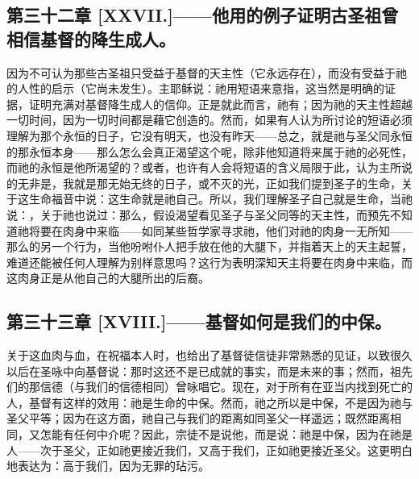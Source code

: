 
\subsection{第三十二章 [XXVII.]——他用的例子证明古圣祖曾相信基督的降生成人。}

因为不可认为那些古圣祖只受益于基督的天主性（它永远存在），而没有受益于祂的人性的启示（它尚未发生）。主耶稣说：祂用短语来意指，这当然是明确的证据，证明充满对基督降生成人的信仰。正是就此而言，祂有；因为祂的天主性超越一切时间，因为一切时间都是藉它创造的。然而，如果有人认为所讨论的短语必须理解为那个永恒的日子，它没有明天，也没有昨天——总之，就是祂与圣父同永恒的那永恒本身——那么怎么会真正渴望这个呢，除非他知道将来属于祂的必死性，而祂的永恒是他所渴望的？或者，也许有人会将短语的含义局限于此，认为主所说的无非是，我就是那无始无终的日子，或不灭的光，正如我们提到圣子的生命，关于这生命福音中说：这生命就是祂自己。所以，我们理解圣子自己就是生命，当祂说：，关于祂也说过：那么，假设渴望看见圣子与圣父同等的天主性，而预先不知道祂将要在肉身中来临——如同某些哲学家寻求祂，他们对祂的肉身一无所知——那么的另一个行为，当他吩咐仆人把手放在他的大腿下，并指着天上的天主起誓，难道还能被任何人理解为别样意思吗？这行为表明深知天主将要在肉身中来临，而这肉身正是从他自己的大腿所出的后裔。\par


\subsection{第三十三章 [XVIII.]——基督如何是我们的中保。}

关于这血肉与血，在祝福本人时，也给出了基督徒信徒非常熟悉的见证，以致很久以后在圣咏中向基督说：那时这还不是已成就的事实，而是未来的事；然而，祖先们的那信德（与我们的信德相同）曾咏唱它。现在，对于所有在亚当内找到死亡的人，基督有这样的效用：祂是生命的中保。然而，祂之所以是中保，不是因为祂与圣父平等；因为在这方面，祂自己与我们的距离如同圣父一样遥远；既然距离相同，又怎能有任何中介呢？因此，宗徒不是说他，而是说：祂是中保，因为在祂是人——次于圣父，正如祂更接近我们，又高于我们，正如祂更接近圣父。这更明白地表达为：高于我们，因为无罪的玷污。\par

